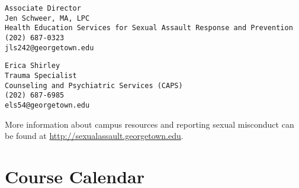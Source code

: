 \documentclass[
  12pt,
]{article}
\begin{document}
\begin{verbatim}
Associate Director
Jen Schweer, MA, LPC
Health Education Services for Sexual Assault Response and Prevention 
(202) 687-0323
jls242@georgetown.edu
\end{verbatim}

\begin{verbatim}
Erica Shirley
Trauma Specialist
Counseling and Psychiatric Services (CAPS) 
(202) 687-6985
els54@georgetown.edu
\end{verbatim}

More information about campus resources and reporting sexual misconduct
can be found at \url{http://sexualassault.georgetown.edu}.

\hypertarget{course-calendar}{%
\section{Course Calendar}\label{course-calendar}}

\begingroup\fontsize{13}{15}\selectfont
\end{document}
